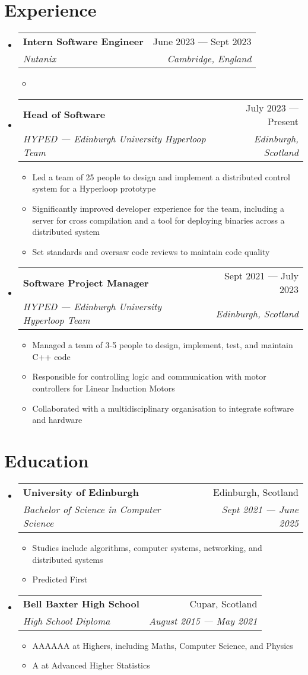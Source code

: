 \documentclass[a4paper,11pt]{article}
\makeatletter
\newcommand{\resumeItem}[1]{
  \item\small{#1}
}
\newcommand{\resumeItemListStart}{\begin{itemize}[rightmargin=0.11in]}
\newcommand{\resumeItemListEnd}{\end{itemize}}
\newcommand{\resumeQuadHeading}[4]{
  \item
  \begin{tabular*}{0.96\textwidth}[t]{l@{\extracolsep{\fill}}r}
    \textbf{#1} & #2 \\
    \textit{\small#3} & \textit{\small #4} \\
  \end{tabular*}
}
\newcommand{\resumeHeadingListStart}{
  \begin{itemize}[leftmargin=0.15in, label={}]
}
\newcommand{\resumeHeadingListEnd}{\end{itemize}}
\makeatother
\begin{document}
\section{Experience}
\resumeHeadingListStart{}
  \resumeQuadHeading{Intern Software Engineer}{June 2023 --- Sept 2023}
  {Nutanix}{Cambridge, England}
    \resumeItemListStart{}
      \resumeItem{}
    \resumeItemListEnd{}
  \resumeQuadHeading{Head of Software}{July 2023 --- Present}
  {HYPED --- Edinburgh University Hyperloop Team}{Edinburgh, Scotland}
    \resumeItemListStart{}
      \resumeItem{Led a team of 25 people to design and implement a distributed control system for a Hyperloop prototype}
      \resumeItem{Significantly improved developer experience for the team, including a server for cross compilation and a tool for deploying binaries across a distributed system}
      \resumeItem{Set standards and oversaw code reviews to maintain code quality}
    \resumeItemListEnd{}  
  \resumeQuadHeading{Software Project Manager}{Sept 2021 --- July 2023}
  {HYPED --- Edinburgh University Hyperloop Team}{Edinburgh, Scotland}
    \resumeItemListStart{}
      \resumeItem{Managed a team of 3-5 people to design, implement, test, and maintain C++ code}
      \resumeItem{Responsible for controlling logic and communication with motor controllers for Linear Induction Motors}
      \resumeItem{Collaborated with a multidisciplinary organisation to integrate software and hardware}
    \resumeItemListEnd{}
\resumeHeadingListEnd{}



\section{Education}
  \resumeHeadingListStart{}
    \resumeQuadHeading{University of Edinburgh}{Edinburgh, Scotland}
    {Bachelor of Science in Computer Science}{Sept 2021 --- June 2025}
      \resumeItemListStart{}
        \resumeItem{Studies include algorithms, computer systems, networking, and distributed systems}
        \resumeItem{Predicted First}
      \resumeItemListEnd{}
    \resumeQuadHeading{Bell Baxter High School}{Cupar, Scotland}
    {High School Diploma}{August 2015 --- May 2021}
        \resumeItemListStart{}
            \resumeItem{AAAAAA at Highers, including Maths, Computer Science, and Physics}
            \resumeItem{A at Advanced Higher Statistics}
        \resumeItemListEnd{}
  \resumeHeadingListEnd{}
\end{document}
